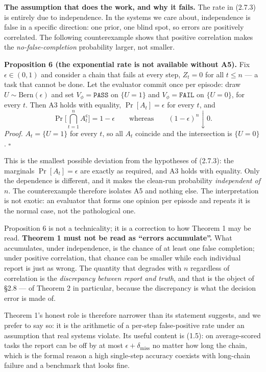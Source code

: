 \documentclass[11pt,a4paper]{article}
\begin{document}
\textbf{The assumption that does the work, and why it fails.} The rate in (2.7.3) is
entirely due to independence. In the systems we care about, independence is
false in a specific direction: one prior, one blind spot, so errors are positively
correlated. The following counterexample shows that positive correlation makes
the \emph{no-false-completion} probability larger, not smaller.

\textbf{Proposition 6 (the exponential rate is not available without A5).} Fix
\(\epsilon\in(0,1)\) and consider a chain that fails at every step, \(Z_t=0\) for all
\(t\le n\) --- a task that cannot be done. Let the evaluator commit once per episode:
draw \(U\sim\mathrm{Bern}(\epsilon)\) and set \(V_\phi=\texttt{PASS}\) on \(\{U=1\}\)
and \(V_\phi=\texttt{FAIL}\) on \(\{U=0\}\), for every \(t\). Then A3 holds with equality,
\(\Pr[A_t]=\epsilon\) for every \(t\), and
\begin{equation}
\Pr\Big[\bigcap_{t=1}^{n}A_t^{\mathsf c}\Big]=1-\epsilon
\qquad\text{whereas}\qquad
(1-\epsilon)^{n}\downarrow0 .
\tag{2.7.7}
\end{equation}
\emph{Proof.} \(A_t=\{U=1\}\) for every \(t\), so all \(A_t\) coincide and the intersection is
\(\{U=0\}\). \(\square\)

This is the smallest possible deviation from the hypotheses of (2.7.3): the marginals
\(\Pr[A_t]=\epsilon\) are exactly as required, and A3 holds with equality. Only the
dependence is different, and it makes the clean-run probability \emph{independent of
\(n\)}. The counterexample therefore isolates A5 and nothing else. The interpretation
is not exotic: an evaluator that forms one opinion per episode and repeats it is
the normal case, not the pathological one.

Proposition 6 is not a technicality; it is a correction to how Theorem 1 may be
read. \textbf{Theorem 1 must not be read as ``errors accumulate''.} What accumulates,
under independence, is the chance of at least one false completion; under positive
correlation, that chance can be smaller while each individual report is just as
wrong. The quantity that degrades with \(n\) regardless of correlation is the
\emph{discrepancy between report and truth}, and that is the object of §2.8 --- of Theorem 2
in particular, because the discrepancy is what the decision error is made of.

Theorem 1's honest role is therefore narrower than its statement suggests, and we
prefer to say so: it is the arithmetic of a per-step false-positive rate under an
assumption that real systems violate. Its useful content is (1.5): on
average-scored tasks the report can be off by at most \(\epsilon+\delta_{\mathrm{miss}}\)
no matter how long the chain, which is the formal reason a high single-step
accuracy coexists with long-chain failure and a benchmark that looks fine.
\end{document}
